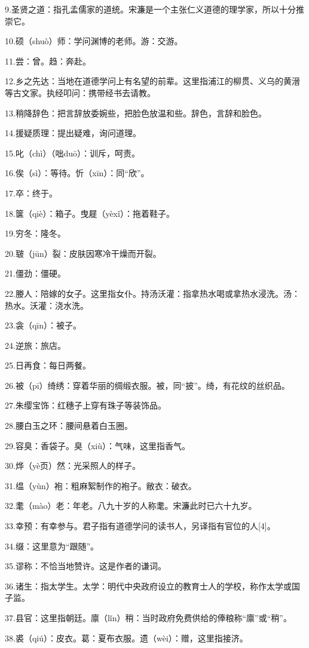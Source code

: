 \documentclass[letterpaper,12pt,english]{sphinxmanual}
\begin{document}
9.圣贤之道：指孔孟儒家的道统。宋濂是一个主张仁义道德的理学家，所以十分推崇它。

10.硕（shuò）师：学问渊博的老师。游：交游。

11.尝：曾。趋：奔赴。

12.乡之先达：当地在道德学问上有名望的前辈。这里指浦江的柳贯、义乌的黄溍等古文家。执经叩问：携带经书去请教。

13.稍降辞色：把言辞放委婉些，把脸色放温和些。辞色，言辞和脸色。

14.援疑质理：提出疑难，询问道理。

15.叱（chì）（咄duō）：训斥，呵责。

16.俟（sì）：等待。忻（xīn）：同“欣”。

17.卒：终于。

18.箧（qiè）：箱子。曳屣（yèxǐ）：拖着鞋子。

19.穷冬：隆冬。

20.皲（jūn）裂：皮肤因寒冷干燥而开裂。

21.僵劲：僵硬。

22.媵人：陪嫁的女子。这里指女仆。持汤沃灌：指拿热水喝或拿热水浸洗。汤：热水。沃灌：浇水洗。

23.衾（qīn）：被子。

24.逆旅：旅店。

25.日再食：每日两餐。

26.被（pī）绮绣：穿着华丽的绸缎衣服。被，同“披”。绮，有花纹的丝织品。

27.朱缨宝饰：红穗子上穿有珠子等装饰品。

28.腰白玉之环：腰间悬着白玉圈。

29.容臭：香袋子。臭（xiù）：气味，这里指香气。

30.烨（yè页）然：光采照人的样子。

31.缊（yùn）袍：粗麻絮制作的袍子。敝衣：破衣。

32.耄（mào）老：年老。八九十岁的人称耄。宋濂此时已六十九岁。

33.幸预：有幸参与。君子指有道德学问的读书人，另译指有官位的人{[}4{]}。

34.缀：这里意为“跟随”。

35.谬称：不恰当地赞许。这是作者的谦词。

36.诸生：指太学生。太学：明代中央政府设立的教育士人的学校，称作太学或国子监。

37.县官：这里指朝廷。廪（lǐn）稍：当时政府免费供给的俸粮称“廪”或“稍”。

38.裘（qiú）：皮衣。葛：夏布衣服。遗（wèi）：赠，这里指接济。
\end{document}
